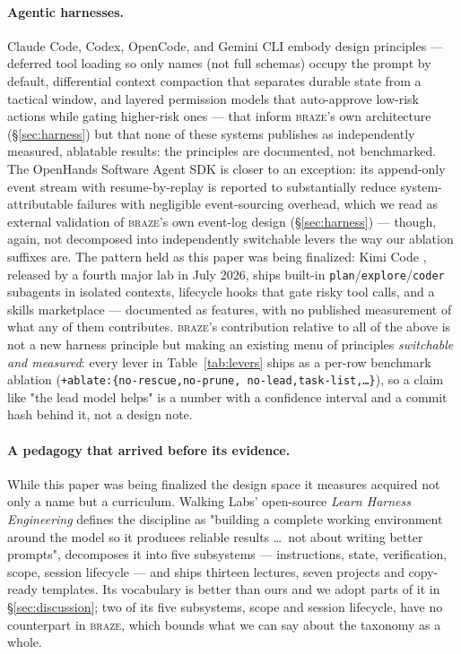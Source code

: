 \documentclass[smallcondensed,natbib]{svjour3}
\newcommand{\braze}{\textsc{braze}}
\begin{document}
\paragraph{Agentic harnesses.} Claude Code, Codex, OpenCode, and Gemini
CLI embody design principles --- deferred tool loading so only names
(not full schemas) occupy the prompt by default, differential context
compaction that separates durable state from a tactical window, and
layered permission models that auto-approve low-risk actions while
gating higher-risk ones --- that inform \braze{}'s own architecture
(\S\ref{sec:harness}) but that none of these systems publishes as
independently measured, ablatable results: the principles are
documented, not benchmarked. The OpenHands Software Agent SDK
\citep{wang2026openhands} is closer to an exception: its append-only
event stream with resume-by-replay is reported to substantially reduce
system-attributable failures with negligible event-sourcing overhead,
which we read as external validation of \braze{}'s own event-log design
(\S\ref{sec:harness}) --- though, again, not decomposed into
independently switchable levers the way our ablation suffixes are.
The pattern held as this paper was being finalized: Kimi Code
\citep{kimicode}, released by a fourth major lab in July 2026, ships
built-in \texttt{plan}/\texttt{explore}/\texttt{coder} subagents in
isolated contexts, lifecycle hooks that gate risky tool calls, and a
skills marketplace --- documented as features, with no published
measurement of what any of them contributes.
\braze{}'s contribution relative to all of the above is not a new
harness principle but making an existing menu of principles
\emph{switchable and measured}: every lever in Table~\ref{tab:levers}
ships as a per-row benchmark ablation
(\texttt{+ablate:\{no-rescue,\allowbreak no-prune,\allowbreak
no-lead,\allowbreak task-list,\allowbreak\ldots\}}), so a claim like
"the lead model helps" is a number with a confidence interval and a
commit hash behind it, not a design note.

\paragraph{A pedagogy that arrived before its evidence.} While this
paper was being finalized the design space it measures acquired not
only a name but a curriculum. Walking Labs' open-source \emph{Learn
Harness Engineering} \citep{walkinglabs2026} defines the discipline as
"building a complete working environment around the model so it
produces reliable results \ldots\ not about writing better prompts",
decomposes it into five subsystems --- instructions, state,
verification, scope, session lifecycle --- and ships thirteen lectures,
seven projects and copy-ready templates. Its vocabulary is better than
ours and we adopt parts of it in \S\ref{sec:discussion}; two of its
five subsystems, scope and session lifecycle, have no counterpart in
\braze{}, which bounds what we can say about the taxonomy as a whole.
\end{document}
